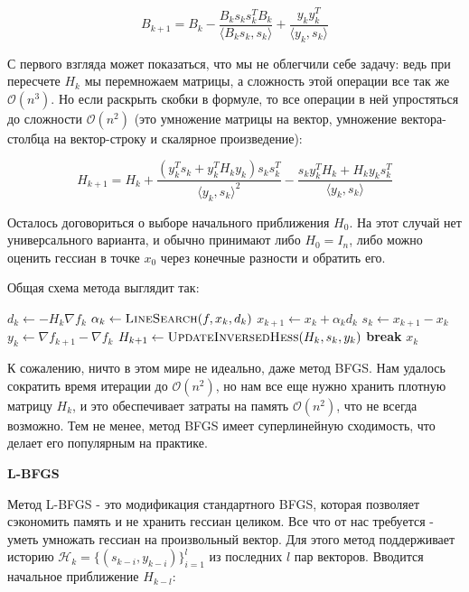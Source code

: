 $$
B_{k+1} = B_k - \frac{B_k s_k s_k^T B_k}{\langle B_k s_k, s_k \rangle} + \frac{y_k y_k^T}{\langle y_k, s_k \rangle}
$$

С первого взгляда может показаться, что мы не облегчили себе задачу: ведь при пересчете $H_k$ мы перемножаем матрицы, а сложность этой операции все так же $\mathcal{O}(n^3)$. Но если раскрыть скобки в формуле, то все операции в ней упростяться до сложности $\mathcal{O}(n^2)$ (это умножение матрицы на вектор, умножение вектора-столбца на вектор-строку и скалярное произведение):

$$
H_{k+1} = H_k + \frac{\left(y_k^T s_k + y_k^T H_k y_k\right) s_k s_k^T}{\langle y_k, s_k \rangle^2} - \frac{s_k y_k^T H_k + H_k y_k s_k^T}{\langle y_k, s_k \rangle}
$$

Осталось договориться о выборе начального приближения $H_0$. На этот случай нет универсального варианта, и обычно принимают либо $H_0 = I_n$, либо можно оценить гессиан в точке $x_0$ через конечные разности и обратить его.

Общая схема метода выглядит так:

\begin{algorithm}[H]
    \begin{algorithmic}[1]
                \State $d_k \gets -H_k \nabla f_k$
                \State $\alpha_k \gets \textsc{LineSearch}(f, x_k, d_k)$
                \State $x_{k+1} \gets x_k + \alpha_k d_k$
                \State $s_k \gets x_{k+1} - x_k$
                \State $y_k \gets \nabla f_{k+1} - \nabla f_k$
                \State $H_{k+1} \gets \textsc{UpdateInversedHess}(H_k, s_k, y_k)$
                    \textbf{break}
                \EndIf
            \EndFor
            \State \Return $x_k$
        \EndProcedure
    \end{algorithmic}
\end{algorithm}

К сожалению, ничто в этом мире не идеально, даже метод BFGS. Нам удалось сократить время итерации до $\mathcal{O}(n^2)$, но нам все еще нужно хранить плотную матрицу $H_k$, и это обеспечивает затраты на память $\mathcal{O}(n^2)$, что не всегда возможно. Тем не менее, метод BFGS имеет суперлинейную сходимость, что делает его популярным на практике.

\vspace{6pt}
\textbf{\large L-BFGS}

Метод L-BFGS - это модификация стандартного BFGS, которая позволяет сэкономить память и не хранить гессиан целиком. Все что от нас требуется - уметь умножать гессиан на произвольный вектор. Для этого метод поддерживает историю $\mathcal{H}_k = \{(s_{k - i}, y_{k - i})\}_{i=1}^l$ из последних $l$ пар векторов. Вводится начальное приближение $H_{k-l}$:

